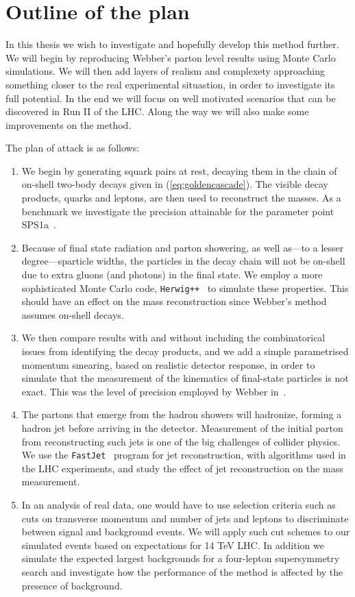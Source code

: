 \documentclass[twoside,english]{uiofysmaster}
\begin{document}
\section{Outline of the plan}
In this thesis we wish to investigate and hopefully develop this method further. We will begin by reproducing Webber's parton level results using Monte Carlo simulations. We will then add layers of realism and complexety approaching something closer to the real experimental situastion, in order to investigate its full potential. In the end we will focus on well motivated scenarios that can be discovered in Run II of the LHC.  Along the way we will also make some improvements on the method.

The plan of attack is as follows:
\begin{enumerate}
	\item We begin by generating squark pairs at rest, decaying them in the chain of on-shell two-body decays given in (\ref{eq:goldencascade}). The visible decay products, quarks and leptons, are then used to reconstruct the masses. As a benchmark we investigate the precision attainable for the parameter point SPS1a~\cite{Allanach:2002nj}. 
	\item Because of final state radiation and parton showering, as well as---to a lesser degree---sparticle widths, the particles in the decay chain will not be on-shell due to extra gluons (and photons) in the final state. We employ a more sophisticated Monte Carlo code, {\tt Herwig++}~\cite{Bahr:2008pv}  to simulate these properties. This should have an effect on the mass reconstruction since Webber's method assumes on-shell decays.
	\item	We then compare results with and without including the combinatorical issues from identifying the decay products, and we add a simple parametrised momentum smearing, based on realistic detector response, in order to simulate that the measurement of the kinematics of final-state particles is not exact. This was the level of precision employed by Webber in~\cite{Webber:2009vm}.
	\item The partons that emerge from the hadron showers will hadronize, forming a hadron jet before arriving in the detector. Measurement of the initial parton from reconstructing such jets is one of the big challenges of collider physics. We use the {\tt FastJet}~\cite{Cacciari:2011ma} program for jet reconstruction, with algorithms used in the LHC experiments, and study the effect of jet reconstruction on the mass measurement.
	\item In an analysis of real data, one would have to use selection criteria such as cuts on transverse momentum and number of jets and leptons to discriminate between signal and background events. We will apply such cut schemes to our simulated events based on expectations for 14 TeV LHC. In addition we simulate the expected largest backgrounds for a four-lepton supersymmetry search and investigate how the performance of the method is affected by the presence of background.

\end{enumerate}
\end{document}

